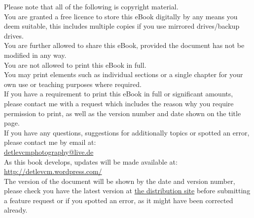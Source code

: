\begin{center}
Please note that all of the following is copyright material.
\\
\vspace{10 mm}
You are granted a free licence to store this eBook digitally by any means you deem suitable, this includes multiple copies if you use mirrored drives/backup drives.
\\
You are further allowed to share this eBook, provided the document has not be modified in any way. 
\\
\vspace{5 mm}
You are not allowed to print this eBook in full.
\\
You may print elements such as individual sections or a single chapter for your own use or teaching purposes where required.
\\
If you have a requirement to print this eBook in full or significant amounts, please contact me with a request which includes the reason why you require permission to print, as well as the version number and date shown on the title page.
\\
\vspace{20 mm}
If you have any questions, suggestions for additionally topics or spotted an error, please contact me by email at:
\\
\href{mailto:detlevcmphotography@live.de}{detlevcmphotography@live.de}
\\
As this book develops, updates will be made available at:
\\
\href{http://detlevcm.wordpress.com/2011/12/23/a-basic-guide-to-photography/}{http://detlevcm.wordpress.com/}
\\
\vspace{20 mm}
The version of the document will be shown by the date and version number, please check you have the latest version at \href{http://detlevcm.wordpress.com/2011/12/23/a-basic-guide-to-photography/}{the distribution site} before submitting a feature request or if you spotted an error, as it might have been corrected already. 
\end{center}
